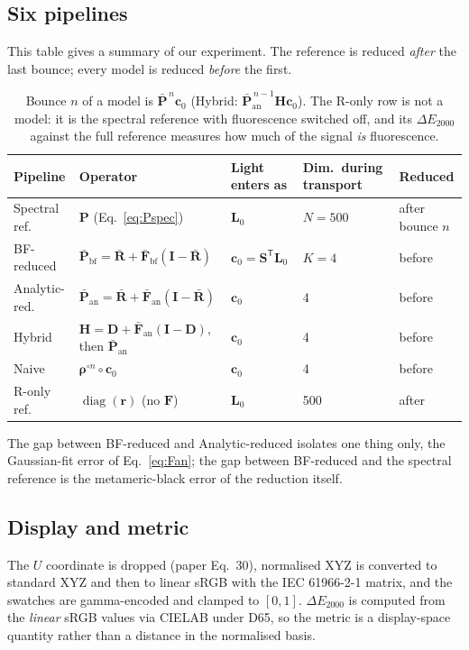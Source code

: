 \documentclass[11pt,a4paper]{article}
\newcommand{\mS}{\mathbf{S}}
\newcommand{\mRb}{\bar{\mathbf{R}}}
\newcommand{\mF}{\mathbf{F}}
\newcommand{\mFb}{\bar{\mathbf{F}}}
\newcommand{\mP}{\mathbf{P}}
\newcommand{\mPb}{\bar{\mathbf{P}}}
\newcommand{\mH}{\mathbf{H}}
\newcommand{\mI}{\mathbf{I}}
\newcommand{\vr}{\mathbf{r}}
\newcommand{\vrho}{\boldsymbol{\rho}}
\newcommand{\vc}{\mathbf{c}}
\newcommand{\vL}{\mathbf{L}}
\newcommand{\diag}{\operatorname{diag}}
\newcommand{\dE}{\Delta E_{2000}}
\newcommand{\transp}{^{\mathsf{T}}}
\begin{document}
\subsection{Six pipelines}

This table gives a summary of our experiment.  The reference is reduced
\emph{after} the last bounce; every model is reduced \emph{before} the first.

\begin{table}[h]\centering\small
\begin{tabular}{@{}lllll@{}}
\toprule
Pipeline & Operator & Light enters as & Dim.\ during transport & Reduced \\
\midrule
Spectral ref.  & $\mP$ (Eq.~\ref{eq:Pspec}) & $\vL_0$ & $N=500$ & after bounce $n$ \\
BF-reduced     & $\mPb_{\text{bf}} = \mRb+\mFb_{\text{bf}}(\mI-\mRb)$ & $\vc_0=\mS\transp\vL_0$ & $K=4$ & before \\
Analytic-red.  & $\mPb_{\text{an}} = \mRb+\mFb_{\text{an}}(\mI-\mRb)$ & $\vc_0$ & 4 & before \\
Hybrid         & $\mH=\mathbf D+\mFb_{\text{an}}(\mI-\mathbf D)$, then $\mPb_{\text{an}}$ & $\vc_0$ & 4 & before \\
Naive          & $\vrho^{\circ n}\circ\vc_0$ & $\vc_0$ & 4 & before \\
R-only ref.    & $\diag(\vr)$ (no $\mF$) & $\vL_0$ & 500 & after \\
\bottomrule
\end{tabular}
\caption{Bounce $n$ of a model is $\mPb^{\,n}\vc_0$ (Hybrid:
$\mPb_{\text{an}}^{\,n-1}\mH\vc_0$).  The R-only row is not a model: it is the
spectral reference with fluorescence switched off, and its $\dE$ against the
full reference measures how much of the signal \emph{is} fluorescence.}
\label{tab:pipelines}
\end{table}

The gap between BF-reduced and Analytic-reduced isolates one thing only, the
Gaussian-fit error of Eq.~\eqref{eq:Fan}; the gap between BF-reduced and the
spectral reference is the metameric-black error of the reduction itself.

\subsection{Display and metric}

The $U$ coordinate is dropped (paper Eq.~30), normalised XYZ is converted to
standard XYZ and then to linear sRGB with the IEC 61966-2-1 matrix, and the
swatches are gamma-encoded and clamped to $[0,1]$.  $\dE$ is computed from the
\emph{linear} sRGB values via CIELAB under D65, so the metric is a display-space
quantity rather than a distance in the normalised basis.
\end{document}
